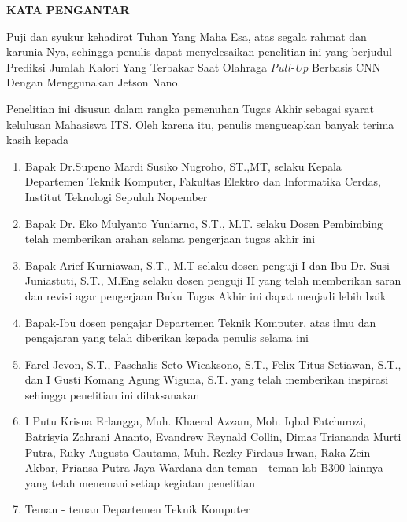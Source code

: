 \begin{center}
  \Large
  \textbf{KATA PENGANTAR}
\end{center}


\vspace{2ex}


Puji dan syukur kehadirat Tuhan Yang Maha Esa, atas segala rahmat dan karunia-Nya,
sehingga penulis dapat menyelesaikan penelitian ini yang berjudul
Prediksi Jumlah Kalori Yang Terbakar Saat Olahraga \emph{Pull-Up} Berbasis CNN Dengan Menggunakan Jetson Nano.


Penelitian ini disusun dalam rangka pemenuhan Tugas Akhir sebagai syarat
kelulusan Mahasiswa ITS. Oleh karena itu, penulis mengucapkan banyak terima kasih kepada

\begin{enumerate}[nolistsep]

  \item Bapak Dr.Supeno Mardi Susiko Nugroho, ST.,MT, selaku Kepala Departemen Teknik Komputer, Fakultas Elektro dan Informatika Cerdas, Institut Teknologi Sepuluh Nopember

  \item Bapak Dr. Eko Mulyanto Yuniarno, S.T., M.T. selaku Dosen Pembimbing telah memberikan arahan selama pengerjaan tugas akhir ini

  \item Bapak Arief Kurniawan, S.T., M.T selaku dosen penguji I dan Ibu Dr. Susi Juniastuti, S.T., M.Eng selaku dosen penguji II yang telah memberikan saran dan revisi agar pengerjaan Buku Tugas Akhir ini dapat menjadi lebih baik

  \item Bapak-Ibu dosen pengajar Departemen Teknik Komputer, atas ilmu dan pengajaran yang telah diberikan kepada penulis selama ini

  \item Farel Jevon, S.T., Paschalis Seto Wicaksono, S.T., Felix Titus Setiawan, S.T., dan I Gusti Komang Agung Wiguna, S.T. yang telah memberikan inspirasi sehingga penelitian ini dilaksanakan

  \item I Putu Krisna Erlangga, Muh. Khaeral Azzam, Moh. Iqbal Fatchurozi, Batrisyia Zahrani Ananto, Evandrew Reynald Collin, Dimas Triananda Murti Putra, Ruky Augusta Gautama, Muh. Rezky Firdaus Irwan, Raka Zein Akbar, Priansa Putra Jaya Wardana dan teman - teman lab B300 lainnya yang telah menemani setiap kegiatan penelitian
  
  \item Teman - teman Departemen Teknik Komputer

\end{enumerate}

